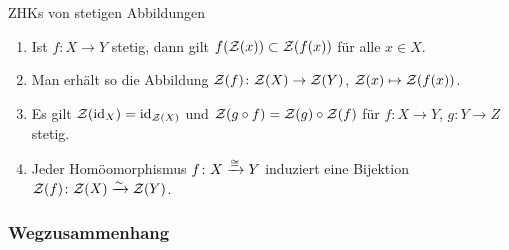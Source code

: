 \begin{Satz}{ZHKs von stetigen Abbildungen}
    \begin{enumerate}
        \item
        Ist $f\colon X \rightarrow Y$ stetig, dann gilt
        $f(\mathcal{Z}(x)) \subset \mathcal{Z}(f(x))$ für alle $x \in X$.
        
        \item
        Man erhält so die Abbildung
        $\mathcal{Z}(f)\colon \mathcal{Z}(X) \rightarrow \mathcal{Z}(Y)$,
        $\mathcal{Z}(x) \mapsto \mathcal{Z}(f(x))$.
        
        \item
        Es gilt $\mathcal{Z}(\operatorname{id}_X) = \operatorname{id}_{\mathcal{Z}(X)}$ und
        $\mathcal{Z}(g \circ f) = \mathcal{Z}(g) \circ \mathcal{Z}(f)$ für
        $f\colon X \rightarrow Y$, $g\colon Y \rightarrow Z$ stetig.
        
        \item
        Jeder Homöomorphismus $f\colon X \xrightarrow{\cong} Y$ induziert eine Bijektion
        $\mathcal{Z}(f)\colon \mathcal{Z}(X) \xrightarrow{\sim} \mathcal{Z}(Y)$.
    \end{enumerate}
\end{Satz}

\subsubsection{%
    Wegzusammenhang%
}

